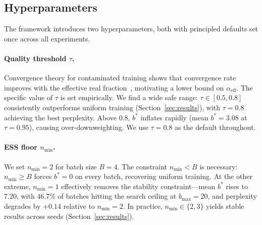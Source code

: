 \subsection{Hyperparameters}
\label{sec:hyperparameters}

The framework introduces two hyperparameters, both with principled defaults set once across all experiments.

\paragraph{Quality threshold $\tau$.}
Convergence theory for contaminated training shows that convergence rate improves with the effective real fraction~\citep{wang_2026_survive_contamination}, motivating a lower bound on $\alpha_{\mathrm{eff}}$.
The specific value of $\tau$ is set empirically.
We find a wide safe range: $\tau \in [0.5, 0.8]$ consistently outperforms uniform training (Section~\ref{sec:results}), with $\tau = 0.8$ achieving the best perplexity.
Above 0.8, $b^{*}$ inflates rapidly (mean $b^{*} = 3.08$ at $\tau = 0.95$), causing over-downweighting.
We use $\tau = 0.8$ as the default throughout.

\paragraph{ESS floor $n_{\min}$.}
We set $n_{\min} = 2$ for batch size $B = 4$.
The constraint $n_{\min} < B$ is necessary: $n_{\min} \geq B$ forces $b^{*} = 0$ on every batch, recovering uniform training.
At the other extreme, $n_{\min} = 1$ effectively removes the stability constraint---mean $b^{*}$ rises to 7.20, with 46.7\% of batches hitting the search ceiling at $b_{\max}{=}20$, and perplexity degrades by $+0.14$ relative to $n_{\min} = 2$.
In practice, $n_{\min} \in \{2, 3\}$ yields stable results across seeds (Section~\ref{sec:results}).
